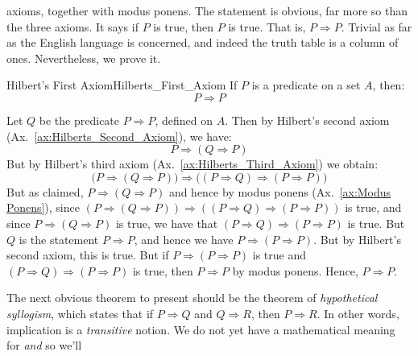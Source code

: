     axioms, together with modus ponens. The statement is obvious, far more so
    than the three axioms. It says if $P$ is true, then $P$ is true. That is,
    $P\Rightarrow{P}$. Trivial as far as the English language is concerned, and
    indeed the truth table is a column of ones. Nevertheless, we prove it.
    \begin{ftheorem}{Hilbert's First Axiom}{Hilberts_First_Axiom}
        If $P$ is a \gls{predicate} on a \gls{set} $A$, then:
        \begin{equation*}
            P\Rightarrow{P}
        \end{equation*}
    \end{ftheorem}
    \begin{bproof}
        Let $Q$ be the predicate $P\Rightarrow{P}$, defined on $A$. Then by
        Hilbert's second axiom (Ax.~\ref{ax:Hilberts_Second_Axiom}), we have:
        \begin{equation}
            P\Rightarrow(Q\Rightarrow{P})
        \end{equation}
        But by Hilbert's third axiom (Ax.~\ref{ax:Hilberts_Third_Axiom}) we
        obtain:
        \begin{equation}
            \big(
                P\Rightarrow(Q\Rightarrow{P})
            \big)\Rightarrow
            \big(
                (P\Rightarrow{Q})\Rightarrow(P\Rightarrow{P})
            \big)
        \end{equation}
        But as claimed, $P\Rightarrow(Q\Rightarrow{P})$ and hence by
        modus ponens (Ax.~\ref{ax:Modus Ponens}), since
        $(P\Rightarrow(Q\Rightarrow{P}))\Rightarrow%
         ((P\Rightarrow{Q})\Rightarrow(P\Rightarrow{P}))$
        is true, and since $P\Rightarrow(Q\Rightarrow{P})$ is true, we have that
        $(P\Rightarrow{Q})\Rightarrow(P\Rightarrow{P})$ is true. But $Q$ is the
        statement $P\Rightarrow{P}$, and hence we have
        $P\Rightarrow(P\Rightarrow{P})$. But by Hilbert's second axiom, this is
        true. But if $P\Rightarrow(P\Rightarrow{P})$ is true and
        $(P\Rightarrow{Q})\Rightarrow(P\Rightarrow{P})$ is true, then
        $P\Rightarrow{P}$ by modus ponens. Hence, $P\Rightarrow{P}$.
    \end{bproof}
    The next obvious theorem to present should be the theorem of
    \textit{hypothetical syllogism}, which
    states that if $P\Rightarrow{Q}$ and $Q\Rightarrow{R}$, then
    $P\Rightarrow{R}$. In other words, implication is a \textit{transitive}
    notion. We do not yet have a mathematical meaning for \textit{and} so we'll
